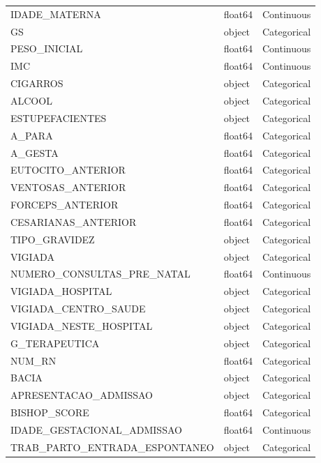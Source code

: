 \documentclass{article}
\begin{document}
\begin{longtable}{lll}
\bottomrule
\endlastfoot
                 IDADE\_MATERNA &  float64 &   Continuous \\
                            GS &   object &  Categorical \\
                  PESO\_INICIAL &  float64 &   Continuous \\
                           IMC &  float64 &   Continuous \\
                      CIGARROS &   object &  Categorical \\
                        ALCOOL &   object &  Categorical \\
               ESTUPEFACIENTES &   object &  Categorical \\
                        A\_PARA &  float64 &  Categorical \\
                       A\_GESTA &  float64 &  Categorical \\
             EUTOCITO\_ANTERIOR &  float64 &  Categorical \\
             VENTOSAS\_ANTERIOR &  float64 &  Categorical \\
              FORCEPS\_ANTERIOR &  float64 &  Categorical \\
           CESARIANAS\_ANTERIOR &  float64 &  Categorical \\
                 TIPO\_GRAVIDEZ &   object &  Categorical \\
                       VIGIADA &   object &  Categorical \\
    NUMERO\_CONSULTAS\_PRE\_NATAL &  float64 &   Continuous \\
              VIGIADA\_HOSPITAL &   object &  Categorical \\
          VIGIADA\_CENTRO\_SAUDE &   object &  Categorical \\
        VIGIADA\_NESTE\_HOSPITAL &   object &  Categorical \\
                 G\_TERAPEUTICA &   object &  Categorical \\
                        NUM\_RN &  float64 &  Categorical \\
                         BACIA &   object &  Categorical \\
         APRESENTACAO\_ADMISSAO &   object &  Categorical \\
                  BISHOP\_SCORE &  float64 &  Categorical \\
    IDADE\_GESTACIONAL\_ADMISSAO &  float64 &   Continuous \\
 TRAB\_PARTO\_ENTRADA\_ESPONTANEO &   object &  Categorical \\

\end{longtable}
\end{document}
